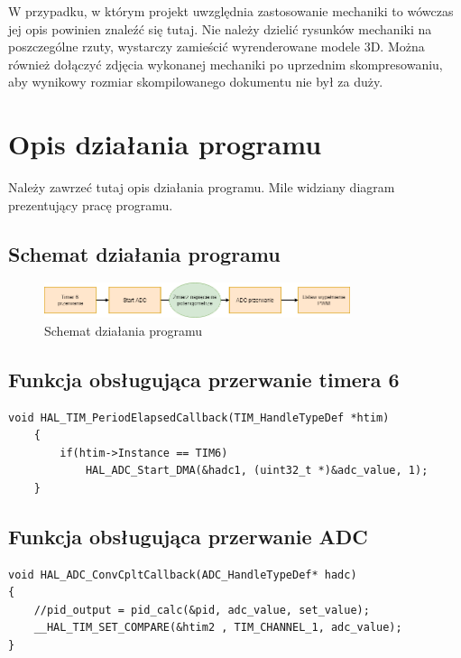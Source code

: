 \documentclass[10pt, a4paper]{article}
\begin{document}
W przypadku, w którym projekt uwzględnia zastosowanie 
mechaniki to wówczas jej opis powinien znaleźć się tutaj.
Nie należy dzielić rysunków mechaniki na poszczególne rzuty, 
wystarczy zamieścić wyrenderowane modele 3D.
Można również dołączyć zdjęcia wykonanej 
mechaniki po uprzednim skompresowaniu, aby wynikowy rozmiar 
skompilowanego dokumentu nie był za duży.

\section{Opis działania programu}

Należy zawrzeć tutaj opis działania programu.
Mile widziany diagram prezentujący pracę programu.
\subsection{Schemat działania programu}
	\begin{figure}[H]
		\centering
		\includegraphics[width=0.8\textwidth]{figures/diagramPWM.png}
		\caption{Schemat działania programu}
		\label{fig:diagramPWM}
	\end{figure}

\subsection{Funkcja obsługująca przerwanie timera 6}
	\begin{lstlisting}[tabsize=2]
	void HAL_TIM_PeriodElapsedCallback(TIM_HandleTypeDef *htim)
	{
		if(htim->Instance == TIM6)
			HAL_ADC_Start_DMA(&hadc1, (uint32_t *)&adc_value, 1);
	}
	\end{lstlisting}

\subsection{Funkcja obsługująca przerwanie ADC}
\begin{lstlisting}[tabsize=2]
void HAL_ADC_ConvCpltCallback(ADC_HandleTypeDef* hadc)
{
	//pid_output = pid_calc(&pid, adc_value, set_value);
	__HAL_TIM_SET_COMPARE(&htim2 , TIM_CHANNEL_1, adc_value);
}
\end{lstlisting}

\end{document}
